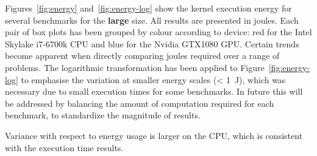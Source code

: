 \documentclass[../document.tex]{subfiles}
\begin{document}

Figures~\ref{fig:energy} and~\ref{fig:energy-log} show the kernel execution energy for several benchmarks for the {\bf large} size.
All results are presented in joules.
Each pair of box plots has been grouped by colour according to device: red for the Intel Skylake i7-6700k CPU and blue for the Nvidia GTX1080 GPU.
Certain trends become apparent when directly comparing joules required over a range of problems.
The logarithmic transformation has been applied to Figure~\ref{fig:energy-log} to emphasise the variation at smaller energy scales (< \SI{1}{\joule}), which was necessary due to small execution times for some benchmarks.
In future this will be addressed by balancing the amount of computation required for each benchmark, to standardize the magnitude of results.

Variance with respect to energy usage is larger on the CPU, which is consistent with the execution time results.
\end{document}
